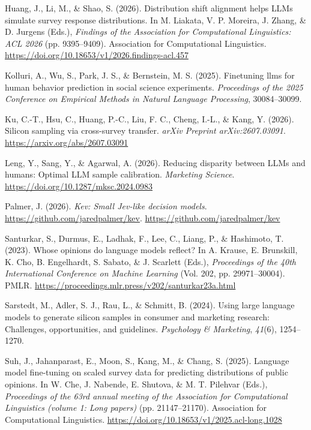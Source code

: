 \documentclass[
  11pt,
  letterpaper,
]{article}
\newlength{\cslhangindent}
\newenvironment{CSLReferences}[2] %
 {\begin{list}{}{%
  \setlength{\itemindent}{0pt}
  \setlength{\leftmargin}{0pt}
  \setlength{\parsep}{0pt}
  \ifodd #1
   \setlength{\leftmargin}{\cslhangindent}
   \setlength{\itemindent}{-1\cslhangindent}
  \fi
  \setlength{\itemsep}{#2\baselineskip}}}
 {\end{list}}
\begin{document}
\begin{CSLReferences}{1}{0}
Huang, J., Li, M., \& Shao, S. (2026). Distribution shift alignment
helps {LLM}s simulate survey response distributions. In M. Liakata, V.
P. Moreira, J. Zhang, \& D. Jurgens (Eds.), \emph{Findings of the
{A}ssociation for {C}omputational {L}inguistics: {ACL} 2026} (pp.
9395--9409). Association for Computational Linguistics.
\url{https://doi.org/10.18653/v1/2026.findings-acl.457}

Kolluri, A., Wu, S., Park, J. S., \& Bernstein, M. S. (2025). Finetuning
llms for human behavior prediction in social science experiments.
\emph{Proceedings of the 2025 Conference on Empirical Methods in Natural
Language Processing}, 30084--30099.

Ku, C.-T., Hsu, C., Huang, P.-C., Liu, F. C., Cheng, I.-L., \& Kang, Y.
(2026). Silicon sampling via cross-survey transfer. \emph{arXiv Preprint
arXiv:2607.03091}. \url{https://arxiv.org/abs/2607.03091}

Leng, Y., Sang, Y., \& Agarwal, A. (2026). Reducing disparity between
{LLM}s and humans: Optimal {LLM} sample calibration. \emph{Marketing
Science}. \url{https://doi.org/10.1287/mksc.2024.0983}

Palmer, J. (2026). \emph{Kev: Small {Jev}-like decision models}.
\url{https://github.com/jaredpalmer/kev}.
\url{https://github.com/jaredpalmer/kev}

Santurkar, S., Durmus, E., Ladhak, F., Lee, C., Liang, P., \& Hashimoto,
T. (2023). Whose opinions do language models reflect? In A. Krause, E.
Brunskill, K. Cho, B. Engelhardt, S. Sabato, \& J. Scarlett (Eds.),
\emph{Proceedings of the 40th {International Conference on Machine
Learning}} (Vol. 202, pp. 29971--30004). PMLR.
\url{https://proceedings.mlr.press/v202/santurkar23a.html}

Sarstedt, M., Adler, S. J., Rau, L., \& Schmitt, B. (2024). Using large
language models to generate silicon samples in consumer and marketing
research: Challenges, opportunities, and guidelines. \emph{Psychology \&
Marketing}, \emph{41}(6), 1254--1270.

Suh, J., Jahanparast, E., Moon, S., Kang, M., \& Chang, S. (2025).
Language model fine-tuning on scaled survey data for predicting
distributions of public opinions. In W. Che, J. Nabende, E. Shutova, \&
M. T. Pilehvar (Eds.), \emph{Proceedings of the 63rd annual meeting of
the {A}ssociation for {C}omputational {L}inguistics (volume 1: Long
papers)} (pp. 21147--21170). Association for Computational Linguistics.
\url{https://doi.org/10.18653/v1/2025.acl-long.1028}


\end{CSLReferences}
\end{document}
